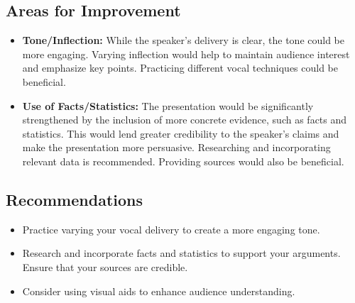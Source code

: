 \documentclass{article}
\begin{document}
\subsection*{Areas for Improvement}

\begin{itemize}
    \item \textbf{Tone/Inflection:} While the speaker's delivery is clear, the tone could be more engaging. Varying inflection would help to maintain audience interest and emphasize key points. Practicing different vocal techniques could be beneficial.
    \item \textbf{Use of Facts/Statistics:} The presentation would be significantly strengthened by the inclusion of more concrete evidence, such as facts and statistics. This would lend greater credibility to the speaker's claims and make the presentation more persuasive. Researching and incorporating relevant data is recommended. Providing sources would also be beneficial.
\end{itemize}

\subsection*{Recommendations}

\begin{itemize}
    \item Practice varying your vocal delivery to create a more engaging tone.
    \item Research and incorporate facts and statistics to support your arguments. Ensure that your sources are credible.
    \item Consider using visual aids to enhance audience understanding.
\end{itemize}
\end{document}
